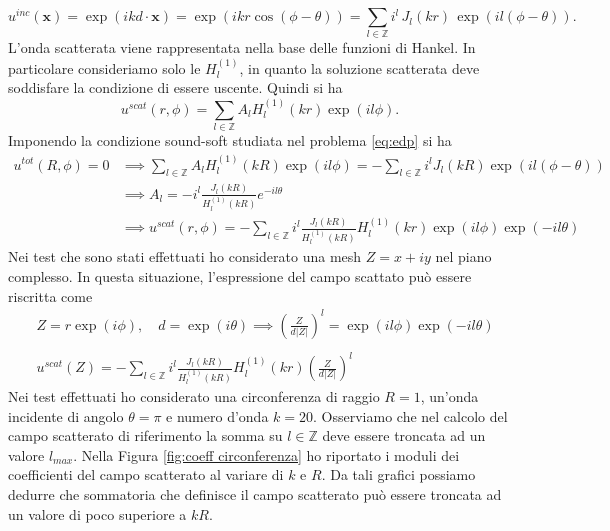 \documentclass[a4paper,12pt]{article}
\theoremstyle{definition}
\begin{document}
\begin{equation}
\label{eq:espansione campo inc}
    u^{inc}(\textbf{x})=\exp(ikd\cdot \textbf{x})=\exp(ikr\cos(\phi-\theta))= \sum_{l \in \mathbb{Z}}i^l\,J_l(kr)\, \exp(il(\phi -\theta)).
\end{equation}
L'onda scatterata viene rappresentata nella base delle funzioni di Hankel. In particolare consideriamo solo le $H_l^{(1)}$, in quanto la soluzione scatterata deve soddisfare la condizione di essere uscente. Quindi si ha 
\begin{equation*}
    u^{scat}(r, \phi)=\sum_{l \in \mathbb{Z}} A_l H_l^{(1)}(kr)\exp(il\phi).
\end{equation*}
Imponendo la condizione sound-soft studiata nel problema \ref{eq:edp} si ha
\begin{equation}
    \label{eq:coeff campo scat}
\begin{aligned}
    u^{tot}(R, \phi)=0 &\implies \sum_{l \in \mathbb{Z}}A_lH_l^{(1)}(kR)\exp(il\phi)=-\sum_{l \in \mathbb{Z}}i^l J_l(kR)\exp(il(\phi-\theta)) \\
    &\implies A_l=-i^l \frac{J_l(kR)}{H_l^{(1)}(kR)}e^{-il\theta} \\
    & \implies u^{scat}(r, \phi)=-\sum_{l \in \mathbb{Z}}i^l \frac{J_l(kR)}{H_l^{(1)}(kR)}H_l^{(1)}(kr)\exp(il\phi)\exp(-il\theta)
\end{aligned}
\end{equation}
Nei test che sono stati effettuati ho considerato una mesh $Z=x +iy$ nel piano complesso. In questa situazione, l'espressione del campo scattato può essere riscritta come
\begin{equation}
\label{eq:riscrittura campo scatterato}
\begin{aligned}
    &Z = r\exp(i\phi), \quad d=\exp(i\theta) \implies \left(\frac{Z}{d|Z|}\right)^l=\exp(il\phi)\exp(-il\theta) \\\\
    &u^{scat}(Z) = -\sum_{l \in \mathbb{Z}}i^l \frac{J_l(kR)}{H_l^{(1)}(kR)}H_l^{(1)}(kr) \left(\frac{Z}{d|Z|}\right)^l
\end{aligned}
\end{equation}
Nei test effettuati ho considerato una circonferenza di raggio $R=1$, un'onda incidente di angolo $\theta = \pi$ e numero d'onda $k=20$. 
Osserviamo che nel calcolo del campo scatterato di riferimento la somma su $l \in \mathbb{Z}$ deve essere troncata ad un valore $l_{max}$. Nella Figura \ref{fig:coeff circonferenza} ho riportato i moduli dei coefficienti del campo scatterato al variare di $k$ e $R$. Da tali grafici possiamo dedurre che sommatoria che definisce il campo scatterato può essere troncata ad un valore di poco superiore a $kR$. 
\end{document}
